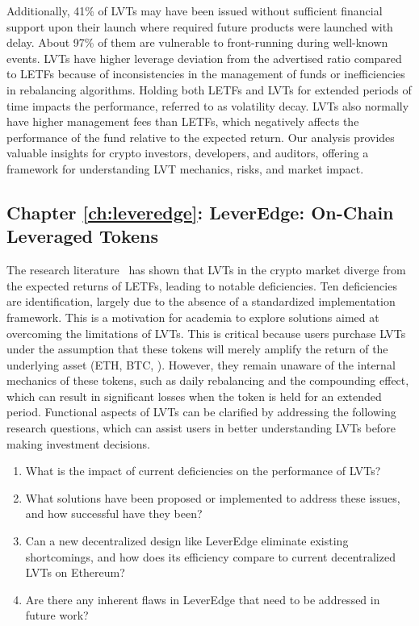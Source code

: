Additionally, 41\% of LVTs may have been issued without sufficient financial support upon their launch where required future products were launched with delay. About 97\% of them are vulnerable to front-running during well-known events. LVTs have higher leverage deviation from the advertised ratio compared to LETFs because of inconsistencies in the management of funds or inefficiencies in rebalancing algorithms. Holding both LETFs and LVTs for extended periods of time impacts the performance, referred to as volatility decay. LVTs also normally have higher management fees than LETFs, which negatively affects the performance of the fund relative to the expected return. Our analysis provides valuable insights for crypto investors, developers, and auditors, offering a framework for understanding LVT mechanics, risks, and market impact.

\subsection{Chapter \ref{ch:leveredge}: LeverEdge: On-Chain Leveraged Tokens} 
The research literature~\cite{shortfall,khomyn2020value,szpruch2024leveraged,Sullivan_2009} has shown that LVTs in the crypto market diverge from the expected returns of LETFs, leading to notable deficiencies. Ten deficiencies are identification, largely due to the absence of a standardized implementation framework. This is a motivation for academia to explore solutions aimed at overcoming the limitations of LVTs. This is critical because users purchase LVTs under the assumption that these tokens will merely amplify the return of the underlying asset (ETH, BTC, \etc). However, they remain unaware of the internal mechanics of these tokens, such as daily rebalancing and the compounding effect, which can result in significant losses when the token is held for an extended period. Functional aspects of LVTs can be clarified by addressing the following research questions, which can assist users in better understanding LVTs before making investment decisions.
\begin{enumerate} [label={(RQ6.\arabic*)},leftmargin=*]
	\item What is the impact of current deficiencies on the performance of LVTs?
	\item What solutions have been proposed or implemented to address these issues, and how successful have they been?
	\item Can a new decentralized design like LeverEdge eliminate existing shortcomings, and how does its efficiency compare to current decentralized LVTs on Ethereum?
	\item Are there any inherent flaws in LeverEdge that need to be addressed in future work?
\end{enumerate}
